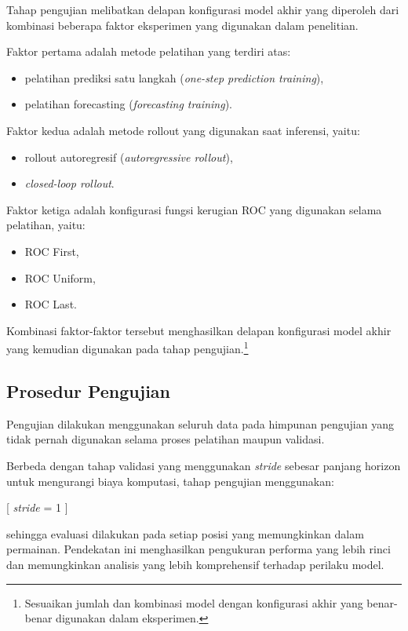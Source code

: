 Tahap pengujian melibatkan delapan konfigurasi model akhir yang diperoleh dari kombinasi beberapa faktor eksperimen yang digunakan dalam penelitian.

Faktor pertama adalah metode pelatihan yang terdiri atas:

\begin{itemize}
\item pelatihan prediksi satu langkah (\textit{one-step prediction training}),
\item pelatihan forecasting (\textit{forecasting training}).
\end{itemize}

Faktor kedua adalah metode rollout yang digunakan saat inferensi, yaitu:

\begin{itemize}
\item rollout autoregresif (\textit{autoregressive rollout}),
\item \textit{closed-loop rollout}.
\end{itemize}

Faktor ketiga adalah konfigurasi fungsi kerugian ROC yang digunakan selama pelatihan, yaitu:

\begin{itemize}
\item ROC First,
\item ROC Uniform,
\item ROC Last.
\end{itemize}

Kombinasi faktor-faktor tersebut menghasilkan delapan konfigurasi model akhir yang kemudian digunakan pada tahap pengujian.\footnote{Sesuaikan jumlah dan kombinasi model dengan konfigurasi akhir yang benar-benar digunakan dalam eksperimen.}

\subsection{Prosedur Pengujian}

Pengujian dilakukan menggunakan seluruh data pada himpunan pengujian yang tidak pernah digunakan selama proses pelatihan maupun validasi.

Berbeda dengan tahap validasi yang menggunakan \textit{stride} sebesar panjang horizon untuk mengurangi biaya komputasi, tahap pengujian menggunakan:

[
\textit{stride} = 1
]

sehingga evaluasi dilakukan pada setiap posisi yang memungkinkan dalam permainan. Pendekatan ini menghasilkan pengukuran performa yang lebih rinci dan memungkinkan analisis yang lebih komprehensif terhadap perilaku model.

